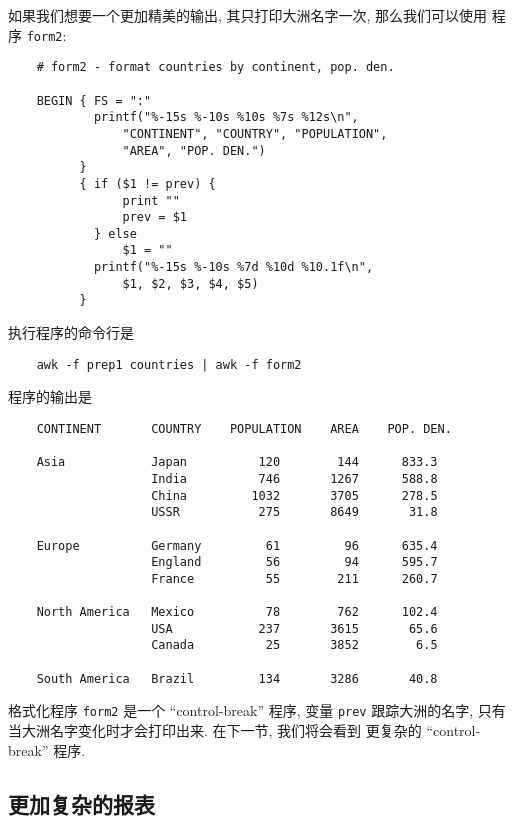如果我们想要一个更加精美的输出, 其只打印大洲名字一次, 那么我们可以使用
程序 \verb'form2':
\begin{verbatim}
    # form2 - format countries by continent, pop. den.

    BEGIN { FS = ":"
            printf("%-15s %-10s %10s %7s %12s\n",
                "CONTINENT", "COUNTRY", "POPULATION",
                "AREA", "POP. DEN.")
          }
          { if ($1 != prev) {
                print ""
                prev = $1
            } else
                $1 = ""
            printf("%-15s %-10s %7d %10d %10.1f\n",
                $1, $2, $3, $4, $5)
          }
\end{verbatim}
执行程序的命令行是 
\begin{verbatim}
    awk -f prep1 countries | awk -f form2
\end{verbatim}
程序的输出是
\begin{verbatim}
    CONTINENT       COUNTRY    POPULATION    AREA    POP. DEN.

    Asia            Japan          120        144      833.3
                    India          746       1267      588.8
                    China         1032       3705      278.5
                    USSR           275       8649       31.8

    Europe          Germany         61         96      635.4
                    England         56         94      595.7
                    France          55        211      260.7

    North America   Mexico          78        762      102.4
                    USA            237       3615       65.6
                    Canada          25       3852        6.5

    South America   Brazil         134       3286       40.8
\end{verbatim}

格式化程序 \verb'form2' 是一个 ``control-break'' 程序, 变量 \verb'prev' 
跟踪大洲的名字, 只有当大洲名字变化时才会打印出来. 在下一节, 我们将会看到 
更复杂的 ``control-break'' 程序.

\subsection{更加复杂的报表}
\label{subsec:a_more_complex_report}

